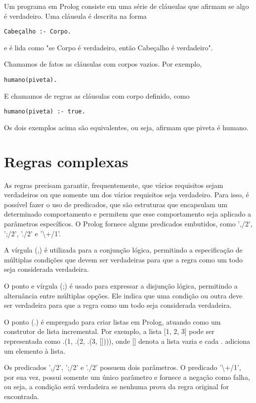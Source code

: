 \documentclass[12pt]{article}
\begin{document}
Um programa em Prolog consiste em uma série de cláusulas que afirmam se algo é verdadeiro. Uma cláusula é descrita na forma
\begin{verbatim}
Cabeçalho :- Corpo.
\end{verbatim}
e é lida como "se Corpo é verdadeiro, então Cabeçalho é verdadeiro".

Chamamos de fatos as cláusulas com corpos vazios. Por exemplo,

\begin{verbatim}
humano(piveta).
\end{verbatim}

E chamamos de regras as cláusulas com corpo definido, como

\begin{verbatim}
humano(piveta) :- true.
\end{verbatim}

Os dois exemplos acima são equivalentes, ou seja, afirmam que piveta é humano.

\section{Regras complexas}

As regras precisam garantir, frequentemente, que vários requisitos sejam verdadeiros ou que somente um dos vários requisitos seja verdadeiro. Para isso, é possível fazer o uso de predicados, que são estruturas que encapsulam um determinado comportamento e permitem que esse comportamento seja aplicado a parâmetros específicos. O Prolog fornece alguns predicados embutidos, como ',/2', ';/2', './2' e '\textbackslash +/1'. 

A vírgula (,) é utilizada para a conjunção lógica, permitindo a especificação de múltiplas condições que devem ser verdadeiras para que a regra como um todo seja considerada verdadeira.

O ponto e vírgula (;) é usado para expressar a disjunção lógica, permitindo a alternância entre múltiplas opções. Ele indica que uma condição ou outra deve ser verdadeira para que a regra como um todo seja considerada verdadeira.

O ponto (.) é empregado para criar listas em Prolog, atuando como um construtor de lista incremental. Por exemplo, a lista [1, 2, 3] pode ser representada como .(1, .(2, .(3, []))), onde [] denota a lista vazia e cada . adiciona um elemento à lista.

Os predicados ',/2', ';/2' e './2' possuem dois parâmetros. O  predicado '\textbackslash +/1', por sua vez, possui somente um único parâmetro e fornece a negação como falha, ou seja, a condição será verdadeira se nenhuma prova da regra original for encontrada.
\end{document}
